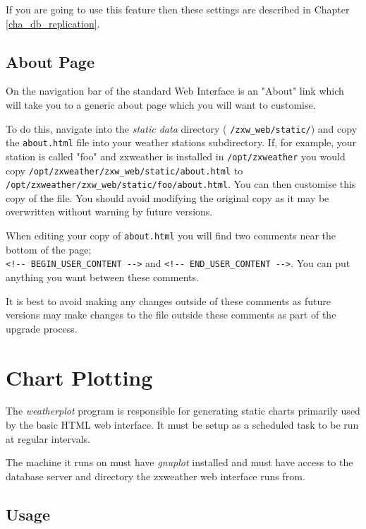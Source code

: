 \documentclass[a4paper,10pt,draft]{book}
\begin{document}
If you are going to use this feature then these settings are described in Chapter \ref{cha_db_replication}.

\subsection{About Page}
On the navigation bar of the standard Web Interface is an "About" link which will take you to a generic about page which you will want to customise.

To do this, navigate into the \emph{static data} directory ( \verb|/zxw_web/static/|) and copy the \verb|about.html| file into your weather stations subdirectory. If, for example, your station is called "foo" and zxweather is installed in \verb|/opt/zxweather| you would copy \verb|/opt/zxweather/zxw_web/static/about.html| to \\ \verb|/opt/zxweather/zxw_web/static/foo/about.html|. You can then customise this copy of the file. You should avoid modifying the original copy as it may be overwritten without warning by future versions.

When editing your copy of \verb|about.html| you will find two comments near the bottom of the page; \\
\verb|<!-- BEGIN_USER_CONTENT -->| and \verb|<!-- END_USER_CONTENT -->|. You can put anything you want between these comments.

It is best to avoid making any changes outside of these comments as future versions may make changes to the file outside these comments as part of the upgrade process.


\section{Chart Plotting}
\label{sec_chart_plotting}

The \emph{weatherplot} program is responsible for generating static charts primarily used by the basic HTML web interface. It must be setup as a scheduled task to be run at regular intervals.

The machine it runs on must have \emph{gnuplot} installed and must have access to the database server and directory the zxweather web interface runs from.

\subsection{Usage}
\end{document}
